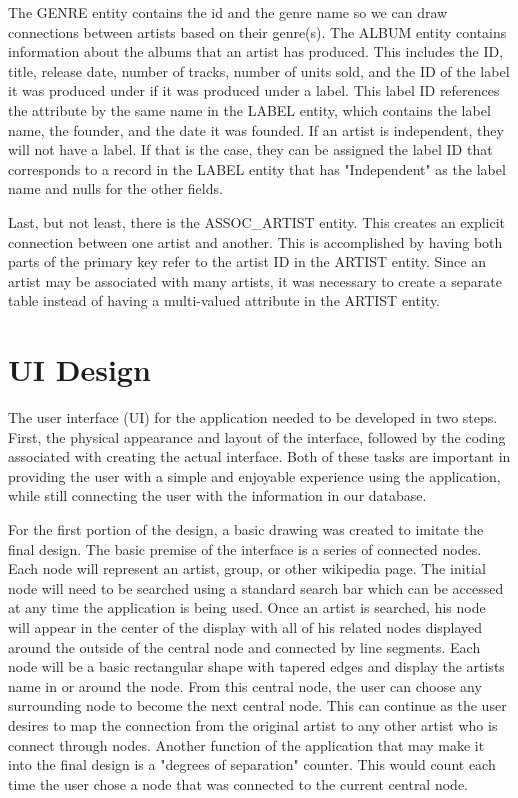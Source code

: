 \documentclass{sig-alternate}
\begin{document}
The GENRE entity contains the id and the genre name so we can draw connections between artists based on their 
genre(s). The ALBUM entity contains information about the albums that an artist has produced. This includes the 
ID, title, release date, number of tracks, number of units sold, and the ID of the label it was produced under 
if it was produced under a label. This label ID references the attribute by the same name in the LABEL entity, 
which contains the label name, the founder, and the date it was founded. If an artist is independent, they will 
not have a label. If that is the case, they can be assigned the label ID that corresponds to a record in the 
LABEL entity that has "Independent" as the label name and nulls for the other fields.

Last, but not least, there is the ASSOC_ARTIST entity. This creates an explicit connection between one artist 
and another. This is accomplished by having both parts of the primary key refer to the artist ID in the ARTIST 
entity. Since an artist may be associated with many artists, it was necessary to create a separate table instead 
of having a multi-valued attribute in the ARTIST entity.

\section{UI Design}
\label{ui design}

The user interface (UI) for the application needed to be developed in two steps. First, the physical appearance 
and layout of the interface, followed by the coding associated with creating the actual interface. Both of these 
tasks are important in providing the user with a simple and enjoyable experience using the application, while 
still connecting the user with the information in our database. 

For the first portion of the design, a basic drawing was created to imitate the final design. The basic premise 
of the interface is a series of connected nodes. Each node will represent an artist, group, or other wikipedia 
page. The initial node will need to be searched using a standard search bar which can be accessed at any time 
the application is being used. Once an artist is searched, his node will appear in the center of the display 
with all of his related nodes displayed around the outside of the central node and connected by line segments. 
Each node will be a basic rectangular shape with tapered edges and display the artists name in or around the node. 
From this central node, the user can choose any surrounding node to become the next central node. This can continue 
as the user desires to map the connection from the original artist to any other artist who is connect through nodes.
Another function of the application that may make it into the final design is a "degrees of separation" counter. 
This would count each time the user chose a node that was connected to the current central node. 
\end{document}
